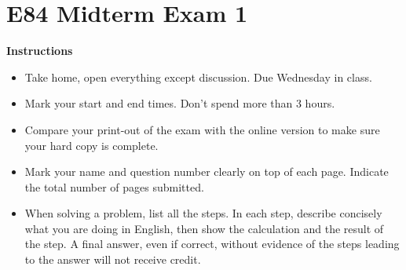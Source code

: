 \section*{E84 Midterm Exam 1}

{\bf Instructions}
\begin{itemize}
\item Take home, open everything except discussion. Due Wednesday in class.
\item Mark your start and end times. Don't spend more than 3 hours.
\item Compare your print-out of the exam with the online version to make
	sure your hard copy is complete.
\item Mark your name and question number clearly on top of each page.
	Indicate the total number of pages submitted.
\item When solving a problem, list all the steps. In each step, describe 
	concisely what you are doing in English, then show the calculation 
	and the result of the step. A final answer, even if correct, without 
	evidence of the steps leading to the answer will not receive credit.
\end{itemize}

